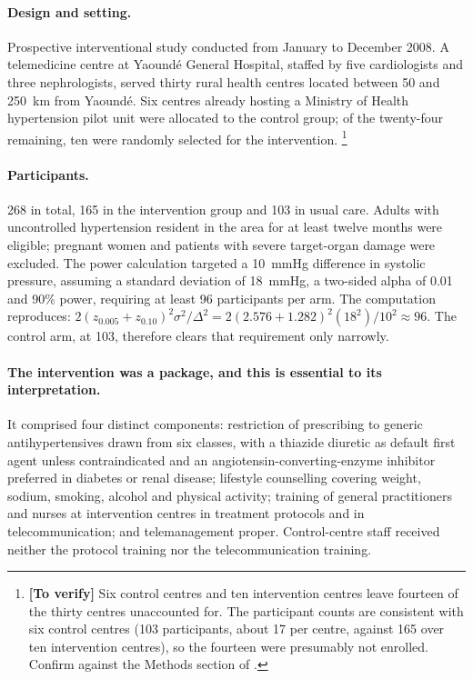 \documentclass[12pt,a4paper,oneside]{report}
\newcommand{\verify}[1]{\footnote{\textbf{[To verify]} #1}}
\begin{document}
\paragraph{Design and setting.} Prospective interventional study conducted from January to December 2008. A telemedicine centre at Yaoundé General Hospital, staffed by five cardiologists and three nephrologists, served thirty rural health centres located between 50 and 250~km from Yaoundé. Six centres already hosting a Ministry of Health hypertension pilot unit were allocated to the control group; of the twenty-four remaining, ten were randomly selected for the intervention.%
\verify{Six control centres and ten intervention centres leave fourteen of the thirty centres unaccounted for. The participant counts are consistent with six control centres (103 participants, about 17 per centre, against 165 over ten intervention centres), so the fourteen were presumably not enrolled. Confirm against the Methods section of \textcite{kingue2013}.}

\paragraph{Participants.} 268 in total, 165 in the intervention group and 103 in usual care. Adults with uncontrolled hypertension resident in the area for at least twelve months were eligible; pregnant women and patients with severe target-organ damage were excluded. The power calculation targeted a 10~mmHg difference in systolic pressure, assuming a standard deviation of 18~mmHg, a two-sided alpha of 0.01 and 90\% power, requiring at least 96 participants per arm. The computation reproduces: $2(z_{0.005}+z_{0.10})^2\sigma^2/\Delta^2 = 2(2.576+1.282)^2(18^2)/10^2 \approx 96$. The control arm, at 103, therefore clears that requirement only narrowly.

\paragraph{The intervention was a package, and this is essential to its interpretation.} It comprised four distinct components: restriction of prescribing to generic antihypertensives drawn from six classes, with a thiazide diuretic as default first agent unless contraindicated and an angiotensin-converting-enzyme inhibitor preferred in diabetes or renal disease; lifestyle counselling covering weight, sodium, smoking, alcohol and physical activity; training of general practitioners and nurses at intervention centres in treatment protocols and in telecommunication; and telemanagement proper. Control-centre staff received neither the protocol training nor the telecommunication training.
\end{document}

